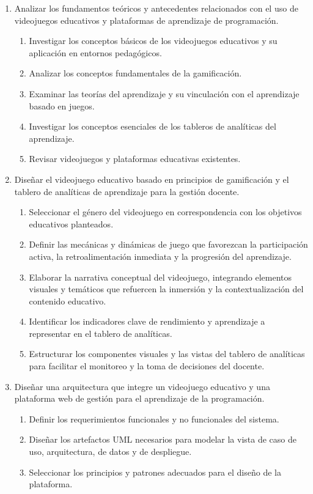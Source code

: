 \begin{enumerate}
	\item Analizar los fundamentos teóricos y antecedentes relacionados con el uso de videojuegos educativos y plataformas de aprendizaje de programación.  
	\begin{enumerate}
		\item Investigar los conceptos básicos de los videojuegos educativos y su aplicación en entornos pedagógicos. 
		\item Analizar los conceptos fundamentales de la gamificación. 
		\item Examinar las teorías del aprendizaje y su vinculación con el aprendizaje basado en juegos.  
		\item Investigar los conceptos esenciales de los tableros de analíticas del aprendizaje.
		\item Revisar videojuegos y plataformas educativas existentes.
	\end{enumerate}
	
	\item Diseñar el videojuego educativo basado en principios de gamificación y el tablero de analíticas de aprendizaje para la gestión docente.
	\begin{enumerate}
		\item Seleccionar el género del videojuego en correspondencia con los objetivos educativos planteados. 
		\item Definir las mecánicas y dinámicas de juego que favorezcan la participación activa, la retroalimentación inmediata y la progresión del aprendizaje.
		\item Elaborar la narrativa conceptual del videojuego, integrando elementos visuales y temáticos que refuercen la inmersión y la contextualización del contenido educativo.
		\item Identificar los indicadores clave de rendimiento y aprendizaje a representar en el tablero de analíticas.
		\item Estructurar los componentes visuales y las vistas del tablero de analíticas para facilitar el monitoreo y la toma de decisiones del docente.
	\end{enumerate}
	
	\item Diseñar una arquitectura que integre un videojuego educativo y una plataforma web de gestión para el aprendizaje de la programación.  
	\begin{enumerate}
		\item Definir los requerimientos funcionales y no funcionales del sistema.  
		\item Diseñar los artefactos UML necesarios para modelar la vista de caso de uso, arquitectura, de datos y de despliegue.
		\item Seleccionar los principios y patrones adecuados para el diseño de la plataforma.  
	\end{enumerate}
	

\end{enumerate}
